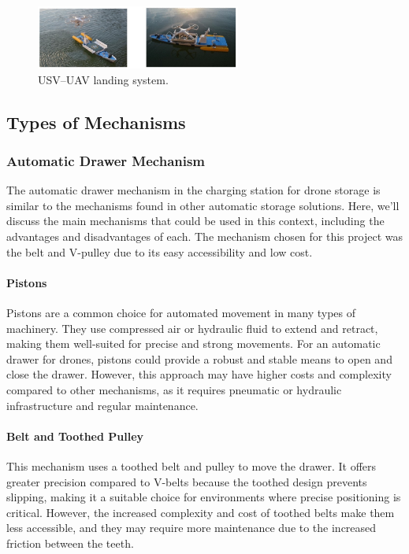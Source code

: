     \begin{figure}[h!]
        \centering
        \includegraphics[width=0.6\textwidth]{pictures/mobile_3.png}
        \caption{USV–UAV landing system.}
        \label{fig:mobile_charging}
    \end{figure}


\subsection{Types of Mechanisms}
    \subsubsection{Automatic Drawer Mechanism}
    The automatic drawer mechanism in the charging station for drone storage is similar to the mechanisms found in other automatic storage solutions. Here, we'll discuss the main mechanisms that could be used in this context, including the advantages and disadvantages of each. The mechanism chosen for this project was the belt and V-pulley due to its easy accessibility and low cost.
    
    \paragraph{Pistons} Pistons are a common choice for automated movement in many types of machinery. They use compressed air or hydraulic fluid to extend and retract, making them well-suited for precise and strong movements. For an automatic drawer for drones, pistons could provide a robust and stable means to open and close the drawer. However, this approach may have higher costs and complexity compared to other mechanisms, as it requires pneumatic or hydraulic infrastructure and regular maintenance.
    
    \paragraph{Belt and Toothed Pulley} This mechanism uses a toothed belt and pulley to move the drawer. It offers greater precision compared to V-belts because the toothed design prevents slipping, making it a suitable choice for environments where precise positioning is critical. However, the increased complexity and cost of toothed belts make them less accessible, and they may require more maintenance due to the increased friction between the teeth.
    
